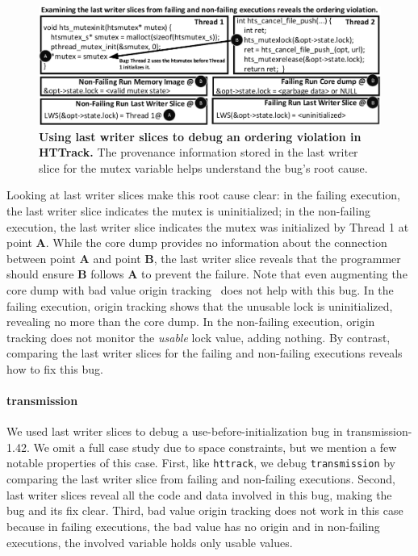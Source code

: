 \documentclass[preprint,10pt]{sigplanconf}
\begin{document}
\begin{figure}[h]
\centering
\includegraphics[width=\columnwidth]{figs/LWSHTTDebug.pdf}
\caption{\label{fig:httlws}{\bf Using last writer slices to debug an
ordering violation in HTTrack.} The provenance information stored in the last
writer slice for the mutex variable helps understand the bug's root cause.}
\end{figure}

Looking at last writer slices make this root cause clear: in the failing
execution, the last writer slice indicates the mutex is uninitialized; in the
non-failing execution, the last writer slice indicates the mutex was
initialized by Thread 1 at point {\bf A}. While the core dump provides no
information about the connection between point {\bf A} and point {\bf B}, the
last writer slice reveals that the programmer should ensure {\bf B} follows
{\bf A} to prevent the failure.  Note that even augmenting the core dump with
bad value origin tracking~\cite{badapples} does not help with this bug.  In the
failing execution, origin tracking shows that the unusable lock is
uninitialized, revealing no more than the core dump.  In the non-failing
execution, origin tracking does not monitor the {\em usable} lock value, adding
nothing.  By contrast, comparing the last writer slices for the failing and
non-failing executions reveals how to fix this bug.  


\paragraph{transmission} We used last writer slices to debug a
use-before-initialization bug in transmission-1.42.  We omit a full case study
due to space constraints, but we mention a few notable properties of this case.
First, like {\tt httrack}, we debug {\tt transmission} by comparing the last
writer slice from failing and non-failing executions.  Second, last writer
slices reveal all the code and data involved in this bug, making the bug and
its fix clear.   Third, bad value origin tracking does not work in this case
because in failing executions, the bad value has no origin and in non-failing
executions, the involved variable holds only usable values.
\end{document}
